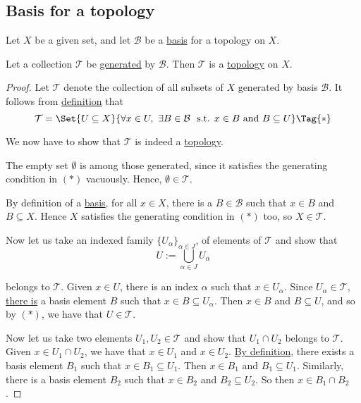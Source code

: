 \subsection{Basis for a topology}\label{b81839f}

\label{ee1b725}

Let $X$ be a given set, and let $\mathcal B$ be a \href{e896402}{basis} for a
topology on $X$.

Let a collection $\mathcal T$ be \href{e6b5306}{generated} by $\mathcal B$.
Then $\mathcal T$ is a \href{cc8eb8b}{topology} on $X$.

\begin{proof}
  Let $\mathcal T$ denote the collection of all subsets of $X$ generated by
  basis $\mathcal B$. It follows from \href{e6b5306}{definition} that
  \begin{equation*}
    \mathcal T=\Set{U\subseteq X}{\forall x\in U,\ \exists B\in\mathcal B\text{ \ s.t. } x\in B\text{ and }B\subseteq U}\Tag{*}
  \end{equation*}

  We now have to show that $\mathcal T$ is indeed a \href{cc8eb8b}{topology}.

  The empty set $\emptyset$ is among those generated, since it satisfies the
  generating condition in $(*)$ vacuously. Hence, $\emptyset\in\mathcal T$.

  By definition of a \href{e896402}{basis}, for all $x\in X$, there is a $B\in
  \mathcal B$ such that $x\in B$ and $B\subseteq X$. Hence $X$ satisfies the
  generating condition in $(*)$ too, so $X\in\mathcal T$.

  Now let us take an indexed family $\{U_\alpha\}_{\alpha\in J}$, of elements
  of $\mathcal T$ and show that
  $$
    U:=\bigcup_{\alpha\in J}U_\alpha
  $$

  belongs to $\mathcal T$. Given $x\in U$, there is an index $\alpha$ such that
  $x\in U_\alpha$. Since $U_\alpha\in\mathcal T$, \href{e896402}{there is} a
  basis element $B$ such that $x\in B\subseteq U_\alpha$. Then $x\in B$ and
  $B\subseteq U$, and so by $(*)$, we have that $U\in\mathcal T$.

  Now let us take two elements $U_1,U_2\in\mathcal T$ and show that $U_1\cap
  U_2$ belongs to $\mathcal T$. Given $x\in U_1\cap U_2$, we have that $x\in
  U_1$ and $x\in U_2$. \href{e896402}{By definition}, there exists a basis
  element $B_1$ such that $x\in B_1\subseteq U_1$. Then $x\in B_1$ and
  $B_1\subseteq U_1$. Similarly, there is a basis element $B_2$ such that $x\in
  B_2$ and $B_2\subseteq U_2$. So then $x\in B_1\cap B_2$.


\end{proof}
